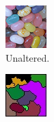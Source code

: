 \documentclass[12pt]{article}
\begin{document}
\begin{figure}
    \centering
  \begin{subfigure}[b]{0.3\textwidth}
      \includegraphics[width=\textwidth]{fig/img3}
      \caption{Unaltered.}
  \end{subfigure}
   \begin{subfigure}[b]{0.3\textwidth}
      \includegraphics[width=\textwidth]{fig/wshed3}

\end{subfigure}
\end{figure}
\end{document}
